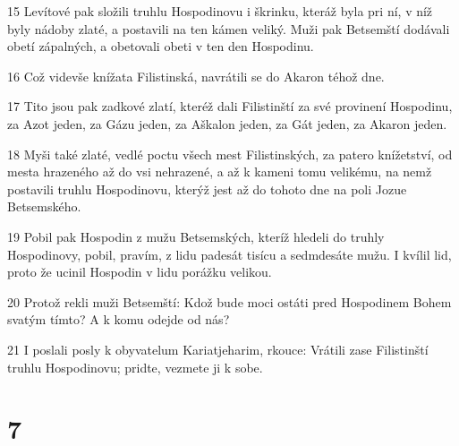 \par 15 Levítové pak složili truhlu Hospodinovu i škrinku, kteráž byla pri ní, v níž byly nádoby zlaté, a postavili na ten kámen veliký. Muži pak Betsemští dodávali obetí zápalných, a obetovali obeti v ten den Hospodinu.
\par 16 Což videvše knížata Filistinská, navrátili se do Akaron téhož dne.
\par 17 Tito jsou pak zadkové zlatí, kteréž dali Filistinští za své provinení Hospodinu, za Azot jeden, za Gázu jeden, za Aškalon jeden, za Gát jeden, za Akaron jeden.
\par 18 Myši také zlaté, vedlé poctu všech mest Filistinských, za patero knížetství, od mesta hrazeného až do vsi nehrazené, a až k kameni tomu velikému, na nemž postavili truhlu Hospodinovu, kterýž jest až do tohoto dne na poli Jozue Betsemského.
\par 19 Pobil pak Hospodin z mužu Betsemských, kteríž hledeli do truhly Hospodinovy, pobil, pravím, z lidu padesát tisícu a sedmdesáte mužu. I kvílil lid, proto že ucinil Hospodin v lidu porážku velikou.
\par 20 Protož rekli muži Betsemští: Kdož bude moci ostáti pred Hospodinem Bohem svatým tímto? A k komu odejde od nás?
\par 21 I poslali posly k obyvatelum Kariatjeharim, rkouce: Vrátili zase Filistinští truhlu Hospodinovu; pridte, vezmete ji k sobe.

\chapter{7}

